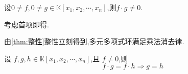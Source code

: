 \begin{formal}
\begin{theorem}[整性]\label{thm:整性}
    设$0\neq f,0\neq g\in\mathbb{K}\left[
    x_1,x_2,\cdots,x_n
    \right]$,则$f\cdot g\neq 0$.
\end{theorem}
\begin{Proof}
考虑首项即得.
\end{Proof}
\end{formal}
\begin{red}
\begin{remark}
    由\cref{thm:整性}整性立刻得到,多元多项式环满足乘法消去律.
\end{remark}
\end{red}
\begin{green}
\begin{corollary}[多元多项式的乘法消去律]\label{cor:多元多项式的乘法消去律}
    设 $f,g,h\in\mathbb{K}\left[x_1,x_2,\cdots,x_n\right]$,且 $f\neq 0$,则
    \[  f\cdot g=f\cdot h\Longrightarrow g=h \]
\end{corollary}
\end{green}
